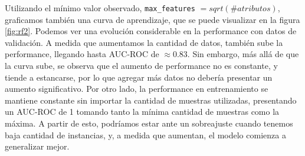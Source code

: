 Utilizando el mínimo valor observado, \texttt{max\_features} $= sqrt(\#atributos)$, graficamos también una curva de aprendizaje, que se puede visualizar en la figura \ref{fig:rf2}. Podemos ver una evolución considerable en la performance con datos de validación. A medida que aumentamos la cantidad de datos, también sube la performance, llegando hasta AUC-ROC de $\approx  0.83$. Sin embargo, más allá de que la curva sube, se observa que el aumento de performance no es constante, y tiende a estancarse, por lo que agregar más datos no debería presentar un aumento significativo. Por otro lado, la performance en entrenamiento se mantiene constante sin importar la cantidad de muestras utilizadas, presentando un AUC-ROC de 1 tomando tanto la mínima cantidad de muestras como la máxima. A partir de esto, podríamos estar ante un sobreajuste cuando tenemos baja cantidad de instancias, y, a medida que aumentan, el modelo comienza a generalizar mejor.
